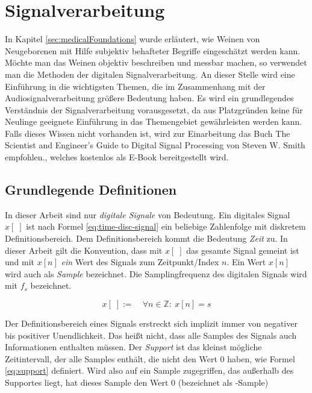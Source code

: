 \section{Signalverarbeitung}
\label{sec:signal_foundations}

In Kapitel \ref{sec:medicalFoundations} wurde erläutert, wie Weinen von Neugeborenen mit Hilfe subjektiv behafteter Begriffe eingeschätzt werden kann. Möchte man das Weinen objektiv beschreiben und messbar machen, so verwendet man die Methoden der digitalen Signalverarbeitung. An dieser Stelle wird eine Einführung in die wichtigsten Themen, die im Zusammenhang mit der Audiosignalverarbeitung größere Bedeutung haben. Es wird ein grundlegendes Verständnis der Signalverarbeitung vorausgesetzt, da aus Platzgründen keine für Neulinge geeignete Einführung in das Themengebiet gewährleisten werden kann. Falls dieses Wissen nicht vorhanden ist, wird zur Einarbeitung das Buch \glqq The Scientist and Engineer's Guide to Digital Signal Processing\grqq{} von Steven W. Smith empfohlen.\cite{dspGuide}, welches kostenlos als E-Book bereitgestellt wird.

\subsection{Grundlegende Definitionen}

In dieser Arbeit sind nur \emph{digitale Signale} von Bedeutung. Ein digitales Signal $x[\;]$ ist nach Formel \ref{eq:time-disc-signal} ein beliebige Zahlenfolge mit diskretem Definitionsbereich. Dem Definitionsbereich kommt die Bedeutung \emph{Zeit} zu.\cite[S. 11-12]{dspGuide} In dieser Arbeit gilt die Konvention, dass mit $x[\;]$ das gesamte Signal gemeint ist und mit $x[n]$ \emph{ein} Wert des Signals zum Zeitpunkt/Index $n$. Ein Wert $x[n]$ wird auch als \emph{Sample} bezeichnet. Die Samplingfrequenz des digitalen Signals wird mit $f_s$ bezeichnet.

\begin{equation}
x[\;] := \quad  \forall n \in \mathbb{Z} :\ x[n] = s
\label{eq:time-disc-signal}
\end{equation}

Der Definitionsbereich eines Signals erstreckt sich implizit immer von negativer bis positiver Unendlichkeit. Das heißt nicht, dass alle Samples des Signals auch Informationen enthalten müssen. Der \emph{Support} ist das kleinst mögliche Zeitintervall, der alle Samples enthält, die nicht den Wert 0 haben, wie Formel \ref{eq:support} definiert. Wird also auf ein Sample zugegriffen, das außerhalb des Supportes liegt, hat dieses Sample den Wert 0 (bezeichnet als -Sample\grqq )\cite[S. 24]{dspMichigan}

